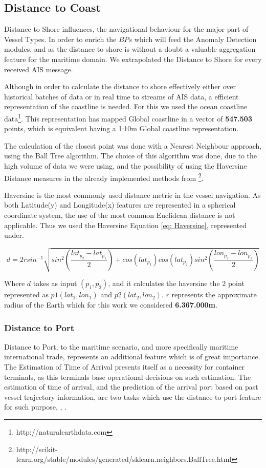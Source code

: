\subsection{Distance to Coast}
\label{subsection: Distance to Coast}
Distance to Shore influences, the navigational behaviour for the major part of Vessel Types. In order to enrich the $BPs$ which will feed the Anomaly Detection modules, and as the distance to shore is without a doubt a valuable aggregation feature for the maritime domain. We extrapolated the Distance to Shore for every received AIS message. 

Although in order to calculate the distance to shore effectively either over historical batches of data or in real time to streams of AIS data, a efficient representation of the coastline is needed. 
For this we used the ocean coastline data\footnote{http://naturalearthdata.com}. This representation has mapped Global coastline in a vector of \textbf{547.503} points, which is equivalent having a 1:10m Global coastline representation.

The calculation of the closest point was done with a Nearest Neighbour approach, using the Ball Tree algorithm. The choice of this algorithm was done, due to the high volume of data we were using, and the possibility of using the Haversine Distance measures in the already implemented methods from \footnote{http://scikit-learn.org/stable/modules/generated/sklearn.neighbors.BallTree.html}.

Haversine is the most commonly used distance metric in the vessel navigation. As both Latitude(y) and Longitude(x) features are represented in a spherical coordinate system, the use of the most common Euclidean distance is not applicable. Thus we used the Haversine Equation \ref{eq: Haversine}, represented under.

\begin{equation}
d = 2r sin ^{-1} \sqrt{sin^2(\frac{lat_{p_2}-lat_{p_1}}{2})+cos(lat_{p_1})cos(lat_{p_2})sin^2(\frac{lon_{p_2}-lon_{p_1}}{2})}
\label{eq: Haversine}
\end{equation}

Where $d$ takes as input $({p_1}, {p_2})$, and it calculates the haversine the 2 point represented as $p1(lat_1, lon_1)$ and $p2(lat_2, lon_2)$. $r$ represents the approximate radius of the Earth which for this work we considered \textbf{6.367.000m}.

\subsubsection{Distance to Port}
Distance to Port, to the maritime scenario, and more specifically maritime international trade, represents an additional feature which is of great importance. The Estimation of Time of Arrival presents itself as a necessity for container terminals, as this terminals base operational decisions on such estimation. The estimation of time of arrival, and the prediction of the arrival port based on past vessel trajectory information, are two tasks which use the distance to port feature for such purpose, \cite{Moussa2018ScalableSpark}, \cite{Rosca2018PredictingRoutes}.

